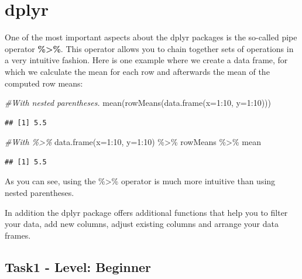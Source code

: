 \documentclass[
  7pt,
]{article}
\newenvironment{Shaded}{\begin{snugshade}}{\end{snugshade}}
\newcommand{\AttributeTok}[1]{\textcolor[rgb]{0.77,0.63,0.00}{#1}}
\newcommand{\CommentTok}[1]{\textcolor[rgb]{0.56,0.35,0.01}{\textit{#1}}}
\newcommand{\DecValTok}[1]{\textcolor[rgb]{0.00,0.00,0.81}{#1}}
\newcommand{\FunctionTok}[1]{\textcolor[rgb]{0.00,0.00,0.00}{#1}}
\newcommand{\NormalTok}[1]{#1}
\newcommand{\SpecialCharTok}[1]{\textcolor[rgb]{0.00,0.00,0.00}{#1}}
\begin{document}
\hypertarget{dplyr}{%
\section{dplyr}\label{dplyr}}

One of the most important aspects about the dplyr packages is the
so-called pipe operator \textbf{\%\textgreater\%}. This operator allows
you to chain together sets of operations in a very intuitive fashion.
Here is one example where we create a data frame, for which we calculate
the mean for each row and afterwards the mean of the computed row means:

\begin{Shaded}
\begin{Highlighting}[]
\CommentTok{\#With nested parentheses.}
\FunctionTok{mean}\NormalTok{(}\FunctionTok{rowMeans}\NormalTok{(}\FunctionTok{data.frame}\NormalTok{(}\AttributeTok{x=}\DecValTok{1}\SpecialCharTok{:}\DecValTok{10}\NormalTok{, }\AttributeTok{y=}\DecValTok{1}\SpecialCharTok{:}\DecValTok{10}\NormalTok{)))}
\end{Highlighting}
\end{Shaded}

\begin{verbatim}
## [1] 5.5
\end{verbatim}

\begin{Shaded}
\begin{Highlighting}[]
\CommentTok{\#With \%\textgreater{}\%}
\FunctionTok{data.frame}\NormalTok{(}\AttributeTok{x=}\DecValTok{1}\SpecialCharTok{:}\DecValTok{10}\NormalTok{, }\AttributeTok{y=}\DecValTok{1}\SpecialCharTok{:}\DecValTok{10}\NormalTok{) }\SpecialCharTok{\%\textgreater{}\%}\NormalTok{ rowMeans }\SpecialCharTok{\%\textgreater{}\%}\NormalTok{ mean}
\end{Highlighting}
\end{Shaded}

\begin{verbatim}
## [1] 5.5
\end{verbatim}

As you can see, using the \%\textgreater\% operator is much more
intuitive than using nested parentheses.

In addition the dplyr package offers additional functions that help you
to filter your data, add new columns, adjust existing columns and
arrange your data frames.

\hypertarget{task1---level-beginner}{%
\subsection{Task1 - Level: Beginner}\label{task1---level-beginner}}
\end{document}
